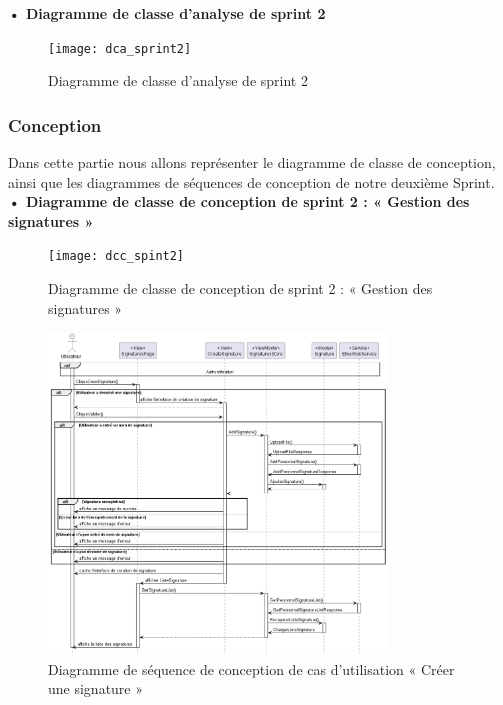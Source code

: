 \textbf{•	Diagramme de classe d'analyse de sprint 2 }

\begin{figure}[H]
  \centering
  \texttt{[image: dca\_sprint2]}
  \caption{Diagramme de classe d'analyse de sprint 2}
  \label{fig:class_analyse_signatures}
\end{figure}


\subsubsection{Conception}
Dans cette partie nous allons représenter le diagramme de classe de conception, ainsi que les diagrammes de séquences de conception de notre deuxième Sprint. \\

\textbf{•	Diagramme de classe de conception de sprint 2 : « Gestion des signatures »}

\begin{figure}[H]
  \centering
  \texttt{[image: dcc\_spint2]}
  \caption{Diagramme de classe de conception de sprint 2 : « Gestion des signatures »}
  \label{fig:class_diagram_signatures}
\end{figure}


\begin{figure}[H]
  \centering
  \includegraphics[width=0.8\textwidth]{out/diagrams/signatures/sequence_create/sequence_create_signature}
  \caption{Diagramme de séquence de conception de cas d'utilisation « Créer une signature  »}
  \label{fig:sequence_conception_create_signature}
\end{figure}

